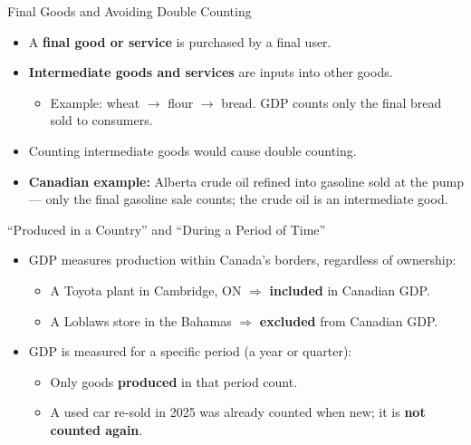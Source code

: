 \documentclass[aspectratio=169]{beamer}
\begin{document}
\begin{frame}{Final Goods and Avoiding Double Counting}
\transfade
\begin{itemize}[<+->]
  \item A \textbf{final good or service} is purchased by a final user.
  \item \textbf{Intermediate goods and services} are inputs into other goods.
  \begin{itemize}[<+->]
    \item Example: wheat $\to$ flour $\to$ bread. GDP counts only the final bread sold to consumers.
  \end{itemize}
  \item Counting intermediate goods would cause \alert{double counting}.
  \item \textbf{Canadian example:} Alberta crude oil refined into gasoline sold at the pump --- only the final gasoline sale counts; the crude oil is an intermediate good.
\end{itemize}
\end{frame}

\begin{frame}{``Produced in a Country'' and ``During a Period of Time''}
\transfade
\begin{itemize}[<+->]
  \item GDP measures production within \alert{Canada's borders}, regardless of ownership:
  \begin{itemize}[<+->]
    \item A Toyota plant in Cambridge, ON $\Rightarrow$ \textbf{included} in Canadian GDP.
    \item A Loblaws store in the Bahamas $\Rightarrow$ \textbf{excluded} from Canadian GDP.
  \end{itemize}
  \item GDP is measured for a specific period (a year or quarter):
  \begin{itemize}[<+->]
    \item Only goods \textbf{produced} in that period count.
    \item A used car re-sold in 2025 was already counted when new; it is \textbf{not counted again}.
  \end{itemize}
\end{itemize}
\end{frame}
\end{document}
